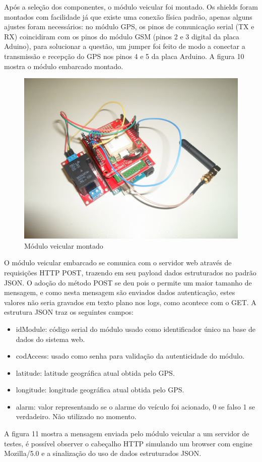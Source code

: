 Após a seleção dos componentes, o módulo veicular foi montado. Os shields foram montados com facilidade já que
existe uma conexão física padrão, apenas alguns ajustes foram necessários: no módulo GPS, os pinos de comunicação
serial (TX e RX) coincidiram com os pinos do módulo GSM (pinos 2 e 3 digital da placa Aduino), para solucionar
a questão, um jumper foi feito de modo a conectar a transmissão e recepção do GPS nos pinos 4 e 5 da placa Arduino.
A figura 10 mostra o módulo embarcado montado.

\begin{figure}[!htb]
	\centering
	\includegraphics[width=5.00cm\textwidth]{figures/prototipo_4.jpg}
	\caption{Módulo veicular montado}
	\label{Figura 10}
\end{figure}

O módulo veicular embarcado se comunica com o servidor web através de requisições HTTP POST, trazendo em seu
payload dados estruturados no padrão JSON. O adoção do método POST se deu pois o permite um maior tamanho de
mensagem, e como nesta mensagem são enviados dados autenticação, estes valores não seria gravados em texto
plano nos logs, como acontece com o GET. A estrutura JSON traz os seguintes campos:

\begin{itemize}
	\item idModule: código serial do módulo usado como identificador único na base de dados do sistema web.
	\item codAccess: usado como senha para validação da autenticidade do módulo.
	\item latitude: latitude geográfica atual obtida pelo GPS.
	\item longitude: longitude geográfica atual obtida pelo GPS.
	\item alarm: valor representando se o alarme do veículo foi acionado, 0 se falso 1 se verdadeiro. Não utilizado no momento.
\end{itemize}

A figura 11 mostra a mensagem enviada pelo módulo veicular a um servidor de testes, é possível observer o cabeçalho HTTP simulando um browser com engine Mozilla/5.0 e a sinalização do uso de dados estruturados JSON.


